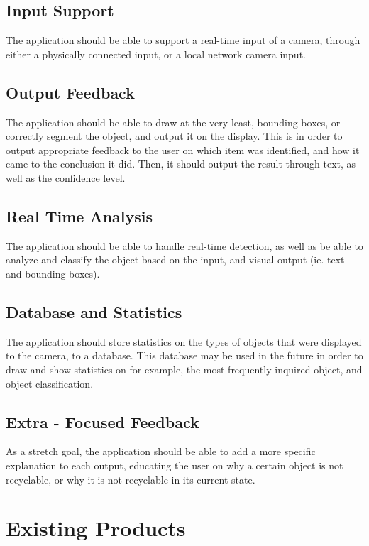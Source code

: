 \documentclass[conference]{IEEEtran}
\begin{document}
\subsection{Input Support}

The application should be able to support a real-time input of a camera, through either a physically connected input, or a local network camera input.

\subsection{Output Feedback}

The application should be able to draw at the very least, bounding boxes, or correctly segment the object, and output it on the display. This is in order to output appropriate feedback to the user on which item was identified, and how it came to the conclusion it did. Then, it should output the result through text, as well as the confidence level.

\subsection{Real Time Analysis}

The application should be able to handle real-time detection, as well as be able to analyze and classify the object based on the input, and  visual output (ie. text and bounding boxes). 

\subsection{Database and Statistics}

The application should store statistics on the types of objects that were displayed to the camera, to a database. This database may be used in the future in order to draw and show statistics on for example, the most frequently inquired object, and object classification.

\subsection{Extra - Focused Feedback}

As a stretch goal, the application should be able to add a more specific explanation to each output, educating the user on why a certain object is not recyclable, or why it is not recyclable in its current state.

\newpage

\section{Existing Products}
\end{document}
